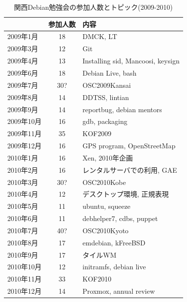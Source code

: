\documentclass[mingoth,a4paper]{jsarticle}
\begin{document}
\begin{table}
  \begin{minipage}{0.5\hsize}
    \caption{関西Debian勉強会の参加人数とトピック(2009-2010)}
    \begin{center}
      \begin{tabular}{|l|c|p{10em}|}
        \hline
                   & 参加人数 & 内容 \\
        \hline
        2009年1月  & 18       & DMCK, LT \\
        2009年3月  & 12       & Git \\
        2009年4月  & 13       & Installing sid, Mancoosi, keysign \\
        2009年6月  & 18       & Debian Live, bash\\
        2009年7月  & 30?      & OSC2009Kansai \\
        2009年8月  & 14       & DDTSS, lintian \\
        2009年9月  & 14       & reportbug, debian mentors\\
        2009年10月 & 16       & gdb, packaging \\
        2009年11月 & 35       & KOF2009 \\
        2009年12月 & 16       & GPS program, OpenStreetMap \\
        2010年1月  & 16       & Xen, 2010年企画 \\
        2010年2月  & 16       & レンタルサーバでの利用, GAE \\
        2010年3月  & 30?      & OSC2010Kobe \\
        2010年4月  & 12       & デスクトップ環境, 正規表現 \\
        2010年5月  & 11       & ubuntu, squeeze \\
        2010年6月  & 11       & debhelper7, cdbs, puppet \\
        2010年7月  & 40?      & OSC2010Kyoto \\
        2010年8月  & 17       & emdebian, kFreeBSD \\
        2010年9月  & 17       & タイルWM \\
        2010年10月 & 12       & initramfs, debian live \\
        2010年11月 & 33       & KOF2010 \\
        2010年12月 & 14       & Proxmox, annual review \\
        \hline
      \end{tabular}
    \end{center}

\end{minipage}
\end{table}
\end{document}
